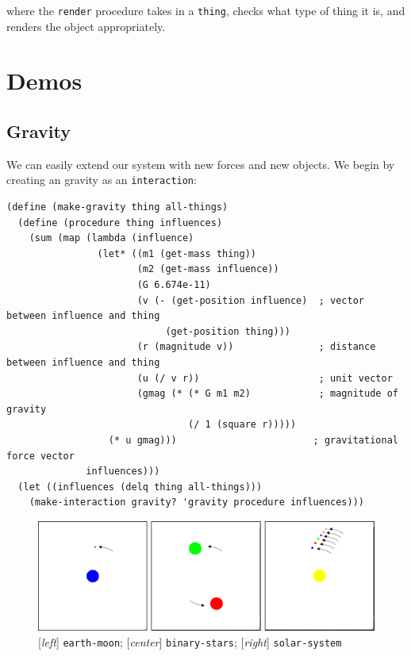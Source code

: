 \documentclass{article}
\begin{document}
where the \texttt{render} procedure takes in a \texttt{thing}, checks what type
of thing it is, and renders the object appropriately.

\section{Demos}
\subsection{Gravity}

We can easily extend our system with new forces and new objects. We begin by
creating an gravity as an \texttt{interaction}:

{\small\begin{verbatim}
(define (make-gravity thing all-things)
  (define (procedure thing influences)
    (sum (map (lambda (influence)
                (let* ((m1 (get-mass thing))
                       (m2 (get-mass influence))
                       (G 6.674e-11)
                       (v (- (get-position influence)  ; vector between influence and thing
                            (get-position thing)))
                       (r (magnitude v))               ; distance between influence and thing
                       (u (/ v r))                     ; unit vector
                       (gmag (* (* G m1 m2)            ; magnitude of gravity
                                (/ 1 (square r)))))
                  (* u gmag)))                        ; gravitational force vector
              influences)))
  (let ((influences (delq thing all-things)))
    (make-interaction gravity? 'gravity procedure influences)))
\end{verbatim}}

\begin{figure}[h!]
  \centering
  \includegraphics[width=\textwidth,height=\textheight,keepaspectratio]
    {figs/gravity.png}
  \caption{[\textit{left}] \texttt{earth-moon}; [\textit{center}]
    \texttt{binary-stars}; [\textit{right}] \texttt{solar-system}}
  \label{figure:gravity}
\end{figure}
\end{document}
